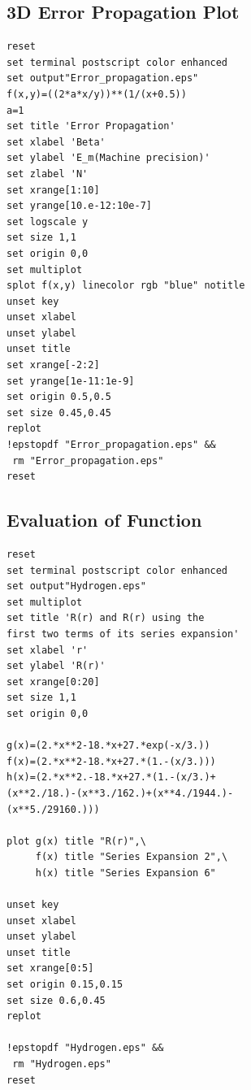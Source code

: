 \documentclass[twocolumn]{article}
\begin{document}
\subsection{3D Error Propagation Plot}\label{3D Error Plot}
\begin{verbatim}
reset
set terminal postscript color enhanced 
set output"Error_propagation.eps"
f(x,y)=((2*a*x/y))**(1/(x+0.5))
a=1
set title 'Error Propagation'
set xlabel 'Beta'
set ylabel 'E_m(Machine precision)'
set zlabel 'N'
set xrange[1:10]
set yrange[10.e-12:10e-7]
set logscale y
set size 1,1
set origin 0,0
set multiplot
splot f(x,y) linecolor rgb "blue" notitle
unset key
unset xlabel
unset ylabel
unset title
set xrange[-2:2]
set yrange[1e-11:1e-9]
set origin 0.5,0.5
set size 0.45,0.45
replot 
!epstopdf "Error_propagation.eps" &&
 rm "Error_propagation.eps"
reset
\end{verbatim}
\subsection{Evaluation of Function}\label{Hydrogen Orbital Function}
\begin{verbatim} 
reset
set terminal postscript color enhanced 
set output"Hydrogen.eps" 
set multiplot 
set title 'R(r) and R(r) using the 
first two terms of its series expansion' 
set xlabel 'r' 
set ylabel 'R(r)' 
set xrange[0:20] 
set size 1,1
set origin 0,0

g(x)=(2.*x**2-18.*x+27.*exp(-x/3.)) 
f(x)=(2.*x**2-18.*x+27.*(1.-(x/3.)))
h(x)=(2.*x**2.-18.*x+27.*(1.-(x/3.)+
(x**2./18.)-(x**3./162.)+(x**4./1944.)-
(x**5./29160.)))

plot g(x) title "R(r)",\
     f(x) title "Series Expansion 2",\
     h(x) title "Series Expansion 6"

unset key
unset xlabel
unset ylabel
unset title
set xrange[0:5]
set origin 0.15,0.15
set size 0.6,0.45
replot 

!epstopdf "Hydrogen.eps" && 
 rm "Hydrogen.eps"
reset

\end{verbatim}
\end{document}
